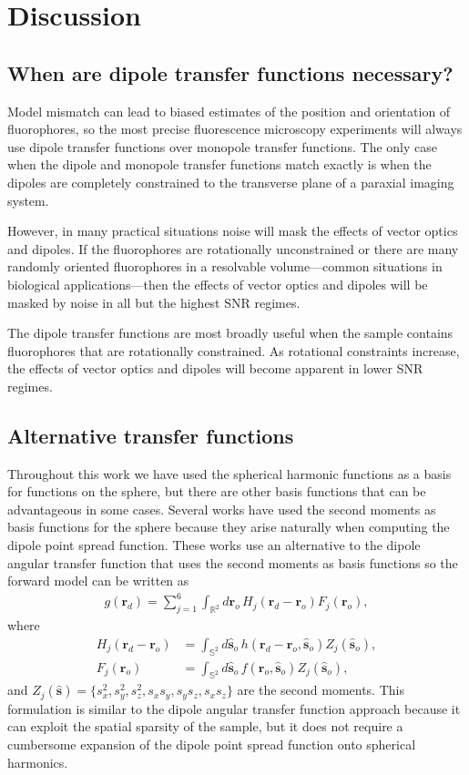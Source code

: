 \documentclass[]{osa-article}
\providecommand{\ro}{\mathbf{\mathbf{r}}_o}
\providecommand{\so}{\mathbf{\hat{s}}_o}
\providecommand{\rd}{\mathbf{r}_d}
\providecommand{\mh}[1]{\mathbf{\hat{#1}}}
\providecommand{\mbb}[1]{\mathbb{#1}}
\begin{document}
\section{Discussion}\label{sec:discussion}
\subsection{When are dipole transfer functions necessary?}
Model mismatch can lead to biased estimates of the position and orientation of
fluorophores, so the most precise fluorescence microscopy experiments will
always use dipole transfer functions over monopole transfer functions. The only
case when the dipole and monopole transfer functions match exactly is when the
dipoles are completely constrained to the transverse plane of a paraxial imaging
system.

However, in many practical situations noise will mask the effects of vector
optics and dipoles. If the fluorophores are rotationally unconstrained or there
are many randomly oriented fluorophores in a resolvable volume---common
situations in biological applications---then the effects of vector optics and
dipoles will be masked by noise in all but the highest SNR regimes.

The dipole transfer functions are most broadly useful when the sample contains
fluorophores that are rotationally constrained. As rotational constraints
increase, the effects of vector optics and dipoles will become apparent in lower
SNR regimes.
 
\subsection{Alternative transfer functions}
Throughout this work we have used the spherical harmonic functions as a basis
for functions on the sphere, but there are other basis functions that can be
advantageous in some cases. Several works \cite{aguet2009, backer2014,
  brasselet2011, zhang2018, zhang2018-2} have used the second moments as basis
functions for the sphere because they arise naturally when computing the dipole
point spread function. These works use an alternative to the dipole angular
transfer function that uses the second moments as basis functions so the forward
model can be written as
\begin{align}
  g(\rd) = \sum_{j=1}^6 \int_{\mbb{R}^2}d\ro\, H_j(\rd - \ro)F_j(\ro),
\end{align}
where
\begin{align}
  H_j(\rd - \ro) &= \int_{\mbb{S}^2}d\so\, h(\rd - \ro, \so)Z_j(\so),\\
  F_j(\ro) &= \int_{\mbb{S}^2}d\so\, f(\ro, \so)Z_j(\so),
\end{align}
and $Z_j(\mh{s}) = \{s_x^2, s_y^2, s_z^2, s_xs_y, s_ys_z, s_xs_z\}$ are the
second moments. This formulation is similar to the dipole angular transfer
function approach because it can exploit the spatial sparsity of the sample, but
it does not require a cumbersome expansion of the dipole point spread function
onto spherical harmonics.
\end{document}
